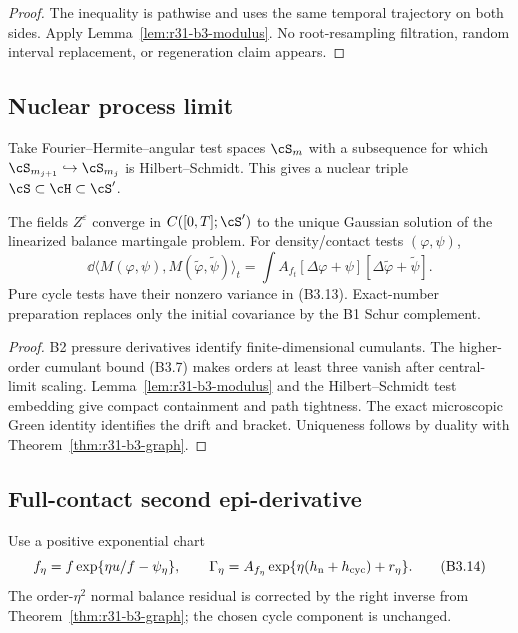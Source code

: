 \begin{proof}
The inequality is pathwise and uses the same temporal trajectory on both
sides.  Apply Lemma~\ref{lem:r31-b3-modulus}.  No root-resampling filtration,
random interval replacement, or regeneration claim appears.
\end{proof}

\subsection{Nuclear process limit}

Take Fourier--Hermite--angular test spaces $\cS_m$ with a subsequence for
which $\cS_{m_{j+1}}\hookrightarrow\cS_{m_j}$ is Hilbert--Schmidt.  This gives
a nuclear triple $\cS\subset\cH\subset\cS'$.

\begin{theorem}
\label{thm:r31-b3-clt}
The fields $Z^\varepsilon$ converge in
$C([0,T];\cS')$ to the unique Gaussian solution of the linearized balance
martingale problem.  For density/contact tests $(\varphi,\psi)$,
\[
 \dd\langle M(\varphi,\psi),M(\widetilde\varphi,
 \widetilde\psi)\rangle_t
 =\int A_{f_t}
 [\Delta\varphi+\psi][\Delta\widetilde\varphi+\widetilde\psi].          \tag{B3.13}
\]
Pure cycle tests have their nonzero variance in (B3.13).  Exact-number
preparation replaces only the initial covariance by the B1 Schur complement.
\end{theorem}

\begin{proof}
B2 pressure derivatives identify finite-dimensional cumulants.  The
higher-order cumulant bound (B3.7) makes orders at least three vanish after
central-limit scaling.  Lemma~\ref{lem:r31-b3-modulus} and the
Hilbert--Schmidt test embedding give compact containment and path tightness.
The exact microscopic Green identity identifies the drift and bracket.
Uniqueness follows by duality with Theorem~\ref{thm:r31-b3-graph}.
\end{proof}

\subsection{Full-contact second epi-derivative}

Use a positive exponential chart
\[
 f_\eta=f\exp\{\eta u/f-\psi_\eta\},
 \qquad
 \Gamma_\eta=A_{f_\eta}
 \exp\{\eta(h_{\rm n}+h_{\rm cyc})+r_\eta\}.              \tag{B3.14}
\]
The order-$\eta^2$ normal balance residual is corrected by the right inverse
from Theorem~\ref{thm:r31-b3-graph}; the chosen cycle component is unchanged.

